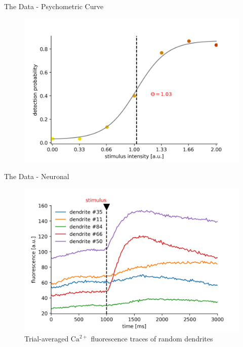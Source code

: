 \documentclass[10pt]{beamer}
\begin{document}
\begin{frame}[fragile]{The Data - Psychometric Curve}
\begin{center}
	\begin{figure}
      \includegraphics[width=\textwidth]{psychometric.png}
	\end{figure}
	\end{center}
	
\end{frame}

\begin{frame}[fragile]{The Data - Neuronal}
	\begin{center}
	\begin{figure}
	\caption*{Trial-averaged $\text{Ca}^{2+}$ fluorescence traces of random dendrites}
      \includegraphics[width=\textwidth]{traces.png}
	\end{figure}
	\end{center}
\end{frame}
\end{document}
